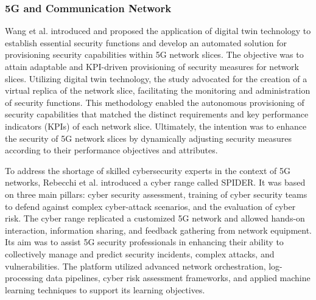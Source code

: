 


\subsubsection*{5G and Communication Network}

Wang et al. \cite{wangDigitalTwinNetwork2022a} introduced and proposed the application of digital twin technology to establish essential security functions and develop an automated solution for provisioning security capabilities within 5G network slices. The objective was to attain adaptable and KPI-driven provisioning of security measures for network slices. Utilizing digital twin technology, the study advocated for the creation of a virtual replica of the network slice, facilitating the monitoring and administration of security functions. This methodology enabled the autonomous provisioning of security capabilities that matched the distinct requirements and key performance indicators (KPIs) of each network slice. Ultimately, the intention was to enhance the security of 5G network slices by dynamically adjusting security measures according to their performance objectives and attributes.

To address the shortage of skilled cybersecurity experts in the context of 5G networks, Rebecchi et al. \cite{rebecchiDigitalTwin5G2022} introduced a cyber range called SPIDER. It was based on three main pillars: cyber security assessment, training of cyber security teams to defend against complex cyber-attack scenarios, and the evaluation of cyber risk. The cyber range replicated a customized 5G network and allowed hands-on interaction, information sharing, and feedback gathering from network equipment. Its aim was to assist 5G security professionals in enhancing their ability to collectively manage and predict security incidents, complex attacks, and vulnerabilities. The platform utilized advanced network orchestration, log-processing data pipelines, cyber risk assessment frameworks, and applied machine learning techniques to support its learning objectives.


